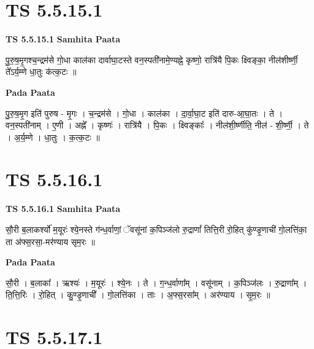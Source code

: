 \documentclass[17pt]{extarticle}
\begin{document}

\section{ TS 5.5.15.1 }

\textbf{TS 5.5.15.1 } \newline
\textbf{Samhita Paata} \newline

पु॒रु॒ष॒मृ॒गश्च॒न्द्रम॑से गो॒धा काल॑का दार्वाघा॒टस्ते वन॒स्पती॑नामे॒ण्यह्ने॒ कृष्णो॒ रात्रि॑यै पि॒कः क्ष्विङ्का॒ नील॑शीर्ष्णी॒ ते᳚ऽर्य॒म्णे धा॒तुः क॑त्क॒टः ॥ \newline

\textbf{Pada Paata} \newline

पु॒रु॒ष॒मृ॒ग इति॑ पुरुष - मृ॒गः । च॒न्द्रम॑से । गो॒धा । काल॑का । दा॒र्वा॒घा॒ट इति॑ दारु-आ॒घा॒तः । ते । वन॒स्पती॑नाम् । ए॒णी । अह्ने᳚ । कृष्णः॑ । रात्रि॑यै । पि॒कः । क्ष्विङ्काः᳚ । नील॑शी॒र्ष्णीति॒ नील॑ - शी॒र्ष्णी॒ । ते । अ॒र्य॒म्णे । धा॒तुः । क॒त्क॒टः ॥  \newline





\section{ TS 5.5.16.1 }

\textbf{TS 5.5.16.1 } \newline
\textbf{Samhita Paata} \newline

सौ॒री ब॒लाकर्श्यो॑ म॒यूरः॑ श्ये॒नस्ते ग॑न्ध॒र्वाणां॒ ॅवसू॑नां क॒पिञ्ज॑लो रु॒द्राणां᳚ तित्ति॒री रो॒हित् कु॑ण्डृ॒णाची॑ गो॒लत्ति॑का॒ ता अ॑फ्स॒रसा॒-मर॑ण्याय सृम॒रः ॥ \newline

\textbf{Pada Paata} \newline

सौ॒री । ब॒लाका᳚ । ऋश्यः॑ । म॒यूरः॑ । श्ये॒नः । ते । ग॒न्ध॒र्वाणा᳚म् । वसू॑नाम् । क॒पिञ्ज॑लः । रु॒द्राणा᳚म् । ति॒त्ति॒रिः । रो॒हित् । कु॒ण्डृ॒णाची᳚ । गो॒लत्ति॑का । ताः । अ॒फ्स॒रसा᳚म् । अर॑ण्याय । सृ॒म॒रः ॥  \newline





\section{ TS 5.5.17.1 }
\end{document}
